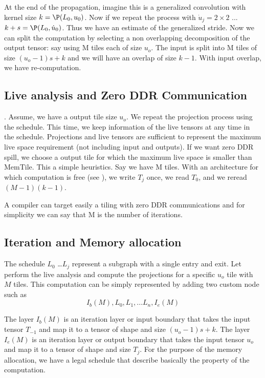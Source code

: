 \documentclass[conference]{IEEEtran}
\begin{document}
At the end of the propagation, imagine this is a generalized
convolution with kernel size $k = \P(L_0, u_0)$. Now if we repeat the
process with $\dot{u}_j = 2\times 2$ ... $k+s = \P(L_0,
\dot{u}_0)$. Thus we have an estimate of the generalized stride.  Now
we can split the computation by selecting a non overlapping
decomposition of the output tensor: say using M tiles each of size
$u_o$. The input is split into M tiles of size $(u_o-1)s+k$ and we
will have an overlap of size $k-1$. With input overlap, we have
re-computation. 

\subsection{Live analysis and Zero DDR Communication}.
Assume, we have a output tile size $u_o$. We repeat the projection
process using the schedule. This time, we keep information of the live
tensors at any time in the schedule. Projections and live tensors are
sufficient to represent the maximum live space requirement (not
including input and outputs). If we want zero DDR spill, we choose a
output tile for which the maximum live space is smaller than
MemTile. This a simple heuristics. Say we have M tiles. With an
architecture for which computation is free (see
\cite{Hong1981IOCT,BilardiPD00}), we write $T_j$ once, we read $T_0$,
and we reread $(M-1)(k-1)$.

A compiler can target easily a tiling with zero DDR communications and
for simplicity we can say that M is the number of iterations.

\subsection{Iteration and Memory allocation}
The schedule $L_0$ \dots $L_j$ represent a subgraph with a single
entry and exit. Let perform the live analysis and compute the
projections for a specific $u_o$ tile with $M$ tiles. This computation
can be simply represented by adding two custom node such as
\[ I_b(M), L_0, L_1, ... L_n, I_e(M) \]

The layer $I_b(M)$ is an iteration layer or input boundary that takes
the input tensor $T_{-1}$ and map it to a tensor of shape and size
$(u_o-1)s+k$. The layer $I_e(M)$ is an iteration layer or output
boundary that takes the input tensor $u_o$ and map it to a tensor of
shape and size $T_j$. For the purpose of the memory allocation, we
have a legal schedule that describe basically the property of the
computation.
\end{document}
